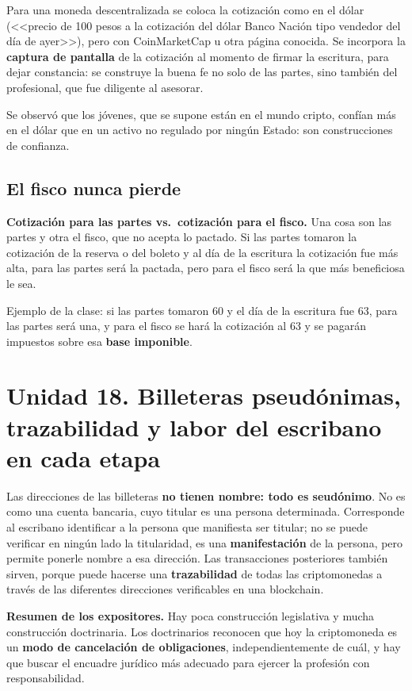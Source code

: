 \documentclass[12pt,oneside,a4paper]{book}
\begin{document}
Para una moneda descentralizada se coloca la cotización como en el dólar (<<precio de 100 pesos a la cotización del dólar Banco Nación tipo vendedor del día de ayer>>), pero con CoinMarketCap u otra página conocida. Se incorpora la \textbf{captura de pantalla} de la cotización al momento de firmar la escritura, para dejar constancia: se construye la buena fe no solo de las partes, sino también del profesional, que fue diligente al asesorar.

Se observó que los jóvenes, que se supone están en el mundo cripto, confían más en el dólar que en un activo no regulado por ningún Estado: son construcciones de confianza.

\subsection{El fisco nunca pierde}

\begin{important}
\textbf{Cotización para las partes vs.\ cotización para el fisco.} Una cosa son las partes y otra el fisco, que no acepta lo pactado. Si las partes tomaron la cotización de la reserva o del boleto y al día de la escritura la cotización fue más alta, para las partes será la pactada, pero para el fisco será la que más beneficiosa le sea.

Ejemplo de la clase: si las partes tomaron 60 y el día de la escritura fue 63, para las partes será una, y para el fisco se hará la cotización al 63 y se pagarán impuestos sobre esa \textbf{base imponible}.
\end{important}

\section{Unidad 18. Billeteras pseudónimas, trazabilidad y labor del escribano en cada etapa}

Las direcciones de las billeteras \textbf{no tienen nombre: todo es seudónimo}. No es como una cuenta bancaria, cuyo titular es una persona determinada. Corresponde al escribano identificar a la persona que manifiesta ser titular; no se puede verificar en ningún lado la titularidad, es una \textbf{manifestación} de la persona, pero permite ponerle nombre a esa dirección. Las transacciones posteriores también sirven, porque puede hacerse una \textbf{trazabilidad} de todas las criptomonedas a través de las diferentes direcciones verificables en una blockchain.

\begin{important}
\textbf{Resumen de los expositores.} Hay poca construcción legislativa y mucha construcción doctrinaria. Los doctrinarios reconocen que hoy la criptomoneda es un \textbf{modo de cancelación de obligaciones}, independientemente de cuál, y hay que buscar el encuadre jurídico más adecuado para ejercer la profesión con responsabilidad.
\end{important}
\end{document}
